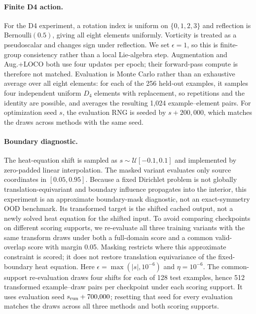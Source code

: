 \paragraph{Finite D4 action.}
For the D4 experiment, a rotation index is uniform on
\(\{0,1,2,3\}\) and reflection is Bernoulli\((0.5)\), giving all eight elements
uniformly.  Vorticity is treated as a pseudoscalar and changes sign under reflection.
We set \(\epsilon=1\), so this is finite-group consistency rather than a local
Lie-algebra step.  Augmentation and Aug.+LOCO both use four updates per epoch; their
forward-pass compute is therefore not matched.  Evaluation is Monte Carlo rather
than an exhaustive average over all eight elements: for each of the 256 held-out
examples, it samples four independent uniform \(D_4\) elements with replacement,
so repetitions and the identity are possible, and averages the resulting 1,024
example--element pairs.  For optimization seed \(s\), the evaluation RNG is seeded
by \(s+200{,}000\), which matches the draws across methods with the same seed.

\paragraph{Boundary diagnostic.}
The heat-equation shift is sampled as \(s\sim\mathcal U[-0.1,0.1]\) and implemented
by zero-padded linear interpolation.  The masked variant evaluates only source
coordinates in \([0.05,0.95]\).  Because a fixed Dirichlet problem is not globally
translation-equivariant and boundary influence propagates into the interior, this
experiment is an approximate boundary-mask diagnostic, not an exact-symmetry OOD
benchmark.  Its transformed target is the shifted cached output, not a newly solved
heat equation for the shifted input.  To avoid comparing checkpoints on different
scoring supports, we re-evaluate all three training variants with the same transform
draws under both a full-domain score and a common valid-overlap score with margin
0.05.  Masking restricts where this approximate constraint is scored; it does not
restore translation equivariance of the fixed-boundary heat equation.  Here
\(\epsilon=\max(|s|,10^{-6})\) and \(\eta=10^{-6}\).  The common-support
re-evaluation draws four shifts for each of 128 test examples, hence 512 transformed
example--draw pairs per checkpoint under each scoring support.  It uses evaluation
seed \(s_{\rm run}+700{,}000\); resetting that seed for every evaluation matches
the draws across all three methods and both scoring supports.

